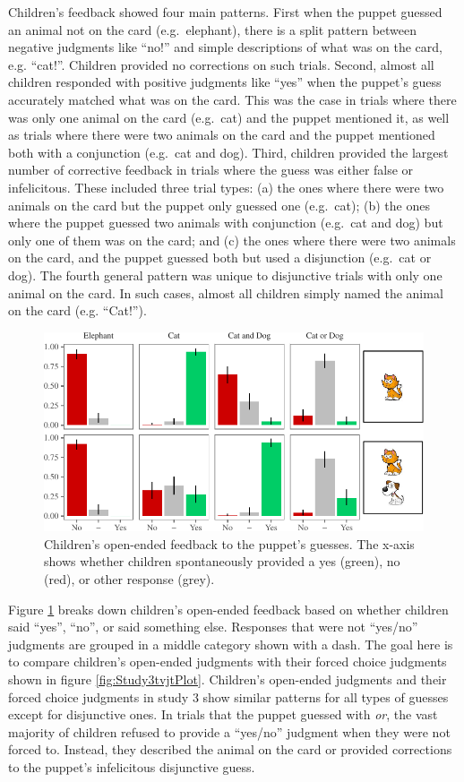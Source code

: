 \documentclass[oneside]{report}
\theoremstyle{definition}
\theoremstyle{definition}
\theoremstyle{definition}
\theoremstyle{remark}
\begin{document}
Children's feedback showed four main patterns. First when the puppet
guessed an animal not on the card (e.g.~elephant), there is a split
pattern between negative judgments like ``no!'' and simple descriptions
of what was on the card, e.g. ``cat!''. Children provided no corrections
on such trials. Second, almost all children responded with positive
judgments like ``yes'' when the puppet's guess accurately matched what
was on the card. This was the case in trials where there was only one
animal on the card (e.g.~cat) and the puppet mentioned it, as well as
trials where there were two animals on the card and the puppet mentioned
both with a conjunction (e.g.~cat and dog). Third, children provided the
largest number of corrective feedback in trials where the guess was
either false or infelicitous. These included three trial types: (a) the
ones where there were two animals on the card but the puppet only
guessed one (e.g.~cat); (b) the ones where the puppet guessed two
animals with conjunction (e.g.~cat and dog) but only one of them was on
the card; and (c) the ones where there were two animals on the card, and
the puppet guessed both but used a disjunction (e.g.~cat or dog). The
fourth general pattern was unique to disjunctive trials with only one
animal on the card. In such cases, almost all children simply named the
animal on the card (e.g. ``Cat!'').
\begin{figure}[t]

{\centering \includegraphics{figs/study3JudgmentPlot-1} 

}

\caption{Children's open-ended feedback to the puppet's guesses. The x-axis shows whether children spontaneously provided a yes (green), no (red), or other response (grey).}\label{fig:study3JudgmentPlot}
\end{figure}
Figure \ref{fig:study3JudgmentPlot} breaks down children's open-ended
feedback based on whether children said ``yes'', ``no'', or said
something else. Responses that were not ``yes/no'' judgments are grouped
in a middle category shown with a dash. The goal here is to compare
children's open-ended judgments with their forced choice judgments shown
in figure \ref{fig:Study3tvjtPlot}. Children's open-ended judgments and
their forced choice judgments in study 3 show similar patterns for all
types of guesses except for disjunctive ones. In trials that the puppet
guessed with \emph{or}, the vast majority of children refused to provide
a ``yes/no'' judgment when they were not forced to. Instead, they
described the animal on the card or provided corrections to the puppet's
infelicitous disjunctive guess.
\end{document}
